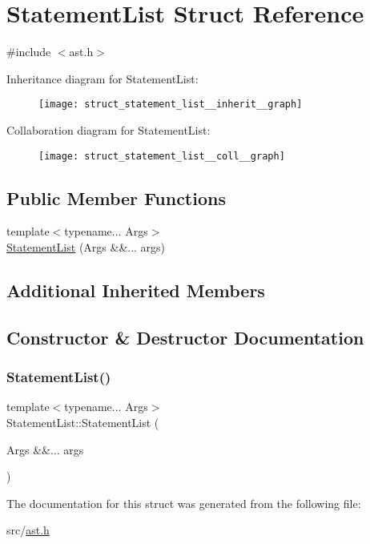 \hypertarget{struct_statement_list}{}\section{Statement\+List Struct Reference}
\label{struct_statement_list}


{\ttfamily \#include $<$ast.\+h$>$}



Inheritance diagram for Statement\+List\+:
\nopagebreak
\begin{figure}[H]
\begin{center}
\leavevmode
\texttt{[image: struct\_statement\_list\_\_inherit\_\_graph]}
\end{center}
\end{figure}


Collaboration diagram for Statement\+List\+:
\nopagebreak
\begin{figure}[H]
\begin{center}
\leavevmode
\texttt{[image: struct\_statement\_list\_\_coll\_\_graph]}
\end{center}
\end{figure}
\subsection*{Public Member Functions}
\begin{DoxyCompactItemize}
\item 
{\footnotesize template$<$typename... Args$>$ }\\\hyperlink{struct_statement_list_a9e3154be364d96ab840141257183b204}{Statement\+List} (Args \&\&... args)
\end{DoxyCompactItemize}
\subsection*{Additional Inherited Members}


\subsection{Constructor \& Destructor Documentation}
\mbox{\label{struct_statement_list_a9e3154be364d96ab840141257183b204}} 
\subsubsection{\texorpdfstring{Statement\+List()}{StatementList()}}
{\footnotesize\ttfamily template$<$typename... Args$>$ \\
Statement\+List\+::\+Statement\+List (\begin{DoxyParamCaption}\item[{Args \&\&...}]{args }\end{DoxyParamCaption})\hspace{0.3cm}{\ttfamily [inline]}}



The documentation for this struct was generated from the following file\+:\begin{DoxyCompactItemize}
\item 
src/\hyperlink{ast_8h}{ast.\+h}\end{DoxyCompactItemize}
